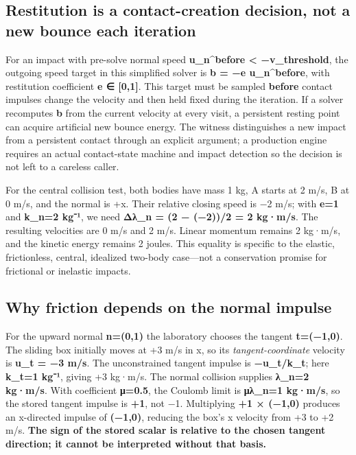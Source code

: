 \subsection{Restitution is a contact-creation decision, not a new bounce each iteration}\label{appendix-c9d92e145503-restitution-is-a-contact-creation-decision-not-a-new-bounce-each-iteration}

\hypertarget{appendix-c9d92e145503-restitution-is-a-contact-creation-decision-not-a-new-bounce-each-iteration}{}

For an impact with pre-solve normal speed \textbf{u\_n\^{}before \textless{} −v\_threshold}, the outgoing speed target in this simplified solver is \textbf{b = −e u\_n\^{}before}, with restitution coefficient \textbf{e ∈ {[}0,1{]}}. This target must be sampled \textbf{before} contact impulses change the velocity and then held fixed during the iteration. If a solver recomputes \textbf{b} from the current velocity at every visit, a persistent resting point can acquire artificial new bounce energy. The witness distinguishes a new impact from a persistent contact through an explicit  argument; a production engine requires an actual contact-state machine and impact detection so the decision is not left to a careless caller.

For the central collision test, both bodies have mass 1 kg, A starts at 2 m/s, B at 0 m/s, and the normal is +x. Their relative closing speed is −2 m/s; with \textbf{e=1} and \textbf{k\_n=2 kg⁻¹}, we need \textbf{Δλ\_n = (2 − (−2))/2 = 2 kg·m/s}. The resulting velocities are 0 m/s and 2 m/s. Linear momentum remains 2 kg·m/s, and the kinetic energy remains 2 joules. This equality is specific to the elastic, frictionless, central, idealized two-body case---not a conservation promise for frictional or inelastic impacts.

\subsection{Why friction depends on the normal impulse}\label{appendix-c9d92e145503-why-friction-depends-on-the-normal-impulse}

\hypertarget{appendix-c9d92e145503-why-friction-depends-on-the-normal-impulse}{}

For the upward normal \textbf{n=(0,1)} the laboratory chooses the tangent \textbf{t=(−1,0)}. The sliding box initially moves at +3 m/s in x, so its \emph{tangent-coordinate} velocity is \textbf{u\_t = −3 m/s}. The unconstrained tangent impulse is \textbf{−u\_t/k\_t}; here \textbf{k\_t=1 kg⁻¹}, giving +3 kg·m/s. The normal collision supplies \textbf{λ\_n=2 kg·m/s}. With coefficient \textbf{μ=0.5}, the Coulomb limit is \textbf{μλ\_n=1 kg·m/s}, so the stored tangent impulse is \textbf{+1}, not −1. Multiplying \textbf{+1 × (−1,0)} produces an x-directed impulse of \textbf{(−1,0)}, reducing the box's x velocity from +3 to +2 m/s. \textbf{The sign of the stored scalar is relative to the chosen tangent direction; it cannot be interpreted without that basis.}

